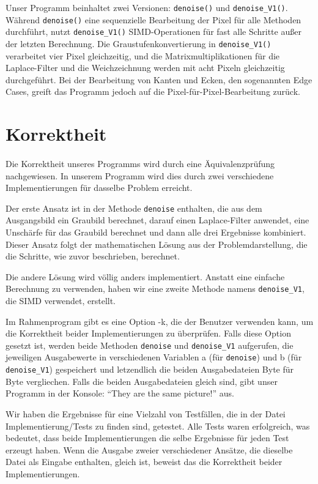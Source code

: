 \documentclass[course=erap]{aspdoc}
\begin{document}
Unser Programm beinhaltet zwei Versionen: \verb|denoise()| und \verb|denoise_V1()|. Während \verb|denoise()| eine sequenzielle 
Bearbeitung der Pixel für alle Methoden durchführt, nutzt \verb|denoise_V1()| SIMD-Operationen für fast alle Schritte außer der
letzten Berechnung. Die Graustufenkonvertierung in \verb|denoise_V1()| verarbeitet vier Pixel gleichzeitig, und die Matrixmultiplikationen 
für die Laplace-Filter und die Weichzeichnung werden mit acht Pixeln gleichzeitig durchgeführt. Bei der Bearbeitung von Kanten und Ecken,
den sogenannten Edge Cases, greift das Programm jedoch auf die Pixel-für-Pixel-Bearbeitung zurück.



\section{Korrektheit}
\paragraph{}Die Korrektheit unseres Programms wird durch eine Äquivalenzprüfung nachgewiesen. In unserem Programm wird dies durch zwei verschiedene Implementierungen für dasselbe Problem erreicht. 

Der erste Ansatz ist in der Methode \verb|denoise| enthalten, die aus dem Ausgangsbild ein Graubild berechnet, darauf einen Laplace-Filter anwendet, eine Unschärfe für das Graubild berechnet und dann alle drei Ergebnisse kombiniert. Dieser Ansatz folgt der mathematischen Lösung aus der Problemdarstellung, die die Schritte, wie zuvor beschrieben, berechnet. 

Die andere Lösung wird völlig anders implementiert. Anstatt eine einfache Berechnung zu verwenden, haben wir eine zweite Methode namens \verb|denoise_V1|, die SIMD verwendet, erstellt.  

Im Rahmenprogram gibt es eine Option -k, die der Benutzer verwenden kann, um die Korrektheit beider Implementierungen zu überprüfen. Falls diese Option gesetzt ist, werden beide Methoden \verb|denoise| und \verb|denoise_V1| aufgerufen, die jeweiligen Ausgabewerte in verschiedenen Variablen a (für \verb|denoise|) und b (für \verb|denoise_V1|) gespeichert und letzendlich die beiden Ausgabedateien Byte für Byte vergliechen. Falls die beiden Ausgabedateien gleich sind, gibt unser Programm in der Konsole: \enquote{They are the same picture!} aus.

Wir haben die Ergebnisse für eine Vielzahl von Testfällen, 
die in der Datei Implementierung/Tests zu finden sind, getestet.
Alle Tests waren erfolgreich, was bedeutet, dass beide Implementierungen die selbe Ergebnisse für jeden Test erzeugt haben. Wenn die Ausgabe zweier verschiedener Ansätze, die dieselbe Datei als Eingabe enthalten, gleich ist, beweist das die Korrektheit beider Implementierungen. 
\end{document}
